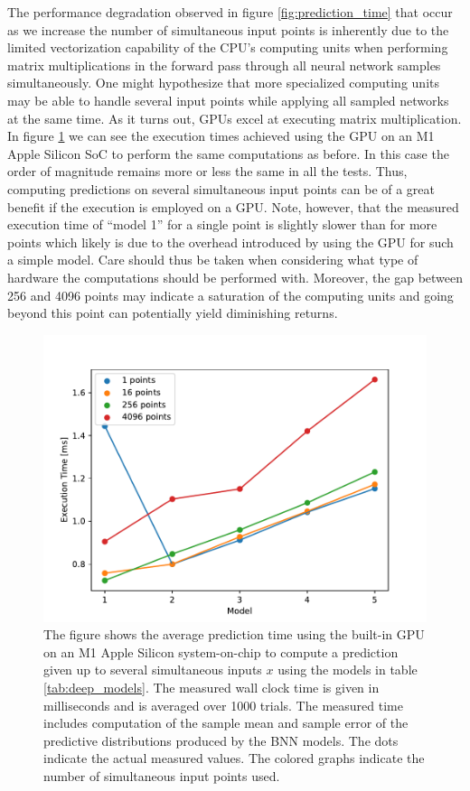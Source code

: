 The performance degradation observed in figure \ref{fig:prediction_time} that occur as we increase the number of simultaneous input points is inherently due to the limited vectorization capability of the CPU's computing units when performing matrix multiplications in the forward pass through all neural network samples simultaneously. One might hypothesize that more specialized computing units may be able to handle several input points while applying all sampled networks at the same time. As it turns out, GPUs excel at executing matrix multiplication. In figure \ref{fig:prediction_time_gpu} we can see the execution times achieved using the GPU on an M1 Apple Silicon SoC to perform the same computations as before. In this case the order of magnitude remains more or less the same in all the tests. Thus, computing predictions on several simultaneous input points can be of a great benefit if the execution is employed on a GPU. Note, however, that the measured execution time of ``model 1'' for a single point is slightly slower than for more points which likely is due to the overhead introduced by using the GPU for such a simple model. Care should thus be taken when considering what type of hardware the computations should be performed with.
Moreover, the gap between 256 and 4096 points may indicate a saturation of the computing units and going beyond this point can potentially yield diminishing returns.


\begin{figure}[H]
    \centering
    \includegraphics[scale=0.7]{figures/prediction_time/prediction_time_gpu.pdf}
    \caption{The figure shows the average prediction time using the built-in GPU on an M1 Apple Silicon system-on-chip to compute a prediction given up to several simultaneous inputs $x$ using the models in table \ref{tab:deep_models}. The measured wall clock time is given in milliseconds and is averaged over 1000 trials. The measured time includes computation of the sample mean and sample error of the predictive distributions produced by the BNN models. The dots indicate the actual measured values. The colored graphs indicate the number of simultaneous input points used.
    }
    \label{fig:prediction_time_gpu}
\end{figure}

